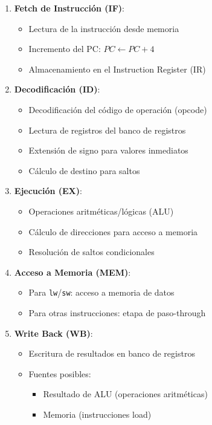 \documentclass{article}
\begin{document}
\begin{enumerate}
    \item \textbf{Fetch de Instrucción (IF)}:
    \begin{itemize}
        \item Lectura de la instrucción desde memoria
        \item Incremento del PC: $PC \leftarrow PC + 4$
        \item Almacenamiento en el Instruction Register (IR)
    \end{itemize}
    
    \item \textbf{Decodificación (ID)}:
    \begin{itemize}
        \item Decodificación del código de operación (opcode)
        \item Lectura de registros del banco de registros
        \item Extensión de signo para valores inmediatos
        \item Cálculo de destino para saltos
    \end{itemize}
    
    \item \textbf{Ejecución (EX)}:
    \begin{itemize}
        \item Operaciones aritméticas/lógicas (ALU)
        \item Cálculo de direcciones para acceso a memoria
        \item Resolución de saltos condicionales
    \end{itemize}
    
    \item \textbf{Acceso a Memoria (MEM)}:
    \begin{itemize}
        \item Para \texttt{lw}/\texttt{sw}: acceso a memoria de datos
        \item Para otras instrucciones: etapa de paso-through
    \end{itemize}
    
    \item \textbf{Write Back (WB)}:
    \begin{itemize}
        \item Escritura de resultados en banco de registros
        \item Fuentes posibles:
        \begin{itemize}
            \item Resultado de ALU (operaciones aritméticas)
            \item Memoria (instrucciones load)
        \end{itemize}
    \end{itemize}
\end{enumerate}
\end{document}
